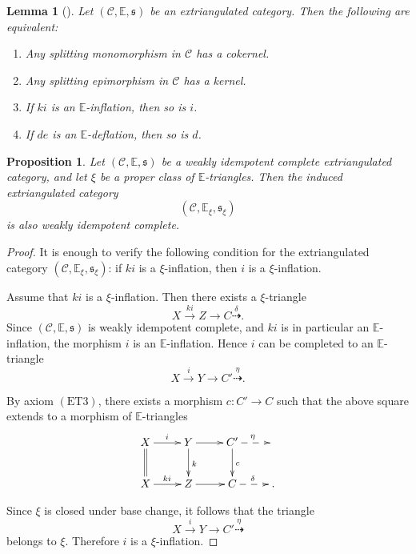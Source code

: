 \documentclass[11pt,a4paper]{amsart}
\numberwithin{equation}{section}
\theoremstyle{plain}
\newtheorem{lem}[thm]{Lemma}
\newtheorem{prop}[thm]{Proposition}
\begin{document}
\begin{lem}[{\cite[Condition 5.8]{NP}}]
	Let $(\mathscr{C},\mathbb{E}, \mathfrak{s})$ be an extriangulated category. Then the following are equivalent:
	\begin{enumerate}
		\item[(1)] Any splitting monomorphism in $\mathscr{C}$ has a cokernel.
		\item[(2)] Any splitting epimorphism in $\mathscr{C}$ has a kernel.
		\item[(3)] If $ki$ is an $\mathbb{E}$-inflation, then so is $i$.
		\item[(4)] If $de$ is an $\mathbb{E}$-deflation, then so is $d$.
	\end{enumerate}
\end{lem}    


\begin{prop}\label{prop:wic-relative}
	Let $(\mathscr{C},\mathbb{E},\mathfrak{s})$ be a weakly idempotent complete extriangulated category, and let $\xi$ be a proper class of $\mathbb{E}$-triangles. Then the induced extriangulated category
	\[
	(\mathscr{C},\mathbb{E}_{\xi},\mathfrak{s}_{\xi})
	\]
	is also weakly idempotent complete.
\end{prop}

\begin{proof}
	It is enough to verify the following condition for the extriangulated category
	$(\mathscr{C},\mathbb{E}_{\xi},\mathfrak{s}_{\xi})$: if $ki$ is a $\xi$-inflation, then $i$ is a $\xi$-inflation.
	
	Assume that $ki$ is a $\xi$-inflation. Then there exists a $\xi$-triangle
	\[
	X \xrightarrow{ki} Z \longrightarrow C\overset{\delta}{\dashrightarrow } .
	\]
	Since $(\mathscr{C},\mathbb{E},\mathfrak{s})$ is weakly idempotent complete, and $ki$ is in particular an $\mathbb{E}$-inflation, the morphism $i$ is an $\mathbb{E}$-inflation. Hence $i$ can be completed to an $\mathbb{E}$-triangle
	\[
X \xrightarrow{i} Y \longrightarrow C' \overset{\eta}{\dashrightarrow} .
	\]
	

	By axiom $(\mathrm{ET3})$, there exists a morphism $c:C'\to C$ such that the above square extends to a morphism of $\mathbb{E}$-triangles
	\[
	\xymatrix{
		X \ar[r]^{i} \ar@{=}[d] &
		Y \ar[r] \ar[d]^{k} &
		C' \ar@{-->}[r]^{\eta} \ar[d]^{c} &
		{} \\
		X \ar[r]^{ki} &
		Z \ar[r] &
		C \ar@{-->}[r]^{\delta} &
		{} .
	}
	\]

	Since $\xi$ is closed under base change, it follows that the triangle
	\[
X \xrightarrow{i} Y \longrightarrow C' \overset{\eta}{\dashrightarrow} 
	\]
	belongs to $\xi$. Therefore $i$ is a $\xi$-inflation.
	
	
\end{proof}
\end{document}
